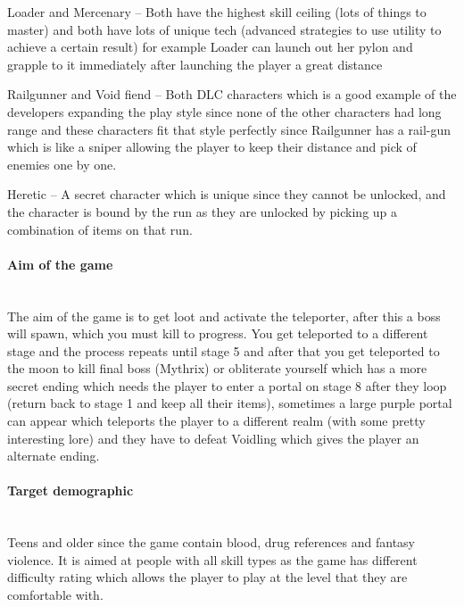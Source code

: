 \documentclass{article}
\newcommand{\parBr}{\vspace{5mm}}%
\newcommand{\myparagraph}[1]{\paragraph{#1}\mbox{}\\} %
\newcommand{\smallBr}{\vspace{1.5mm}}
\begin{document}
\parBr

Loader and Mercenary – Both have the highest skill ceiling (lots of things to master) and both have lots of unique tech (advanced strategies to use utility to achieve a certain result) for example Loader can launch out her pylon and grapple to it immediately after launching the player a great distance 

\parBr

Railgunner and Void fiend – Both DLC characters which is a good example of the developers expanding the play style since none of the other characters had long range and these characters fit that style perfectly since Railgunner has a rail-gun which is like a sniper allowing the player to keep their distance and pick of enemies one by one. 

\parBr

Heretic – A secret character which is unique since they cannot be unlocked, and the character is bound by the run as they are unlocked by picking up a combination of items on that run. 

\myparagraph{Aim of the game}
The aim of the game is to get loot and activate the teleporter, after this a boss will spawn, which you must kill to progress. You get teleported to a different stage and the process repeats until stage 5 and after that you get teleported to the moon to kill final boss (Mythrix) or obliterate yourself which has a more secret ending which needs the player to enter a portal on stage 8 after they loop (return back to stage 1 and keep all their items), sometimes a large purple portal can appear which teleports the player to a different realm (with some pretty interesting lore) and they have to defeat Voidling which gives the player an alternate ending. 

\myparagraph{Target demographic}
Teens and older since the game contain blood, drug references and fantasy violence. It is aimed at people with all skill types as the game has different difficulty rating which allows the player to play at the level that they are comfortable with.
\smallBr
\end{document}
